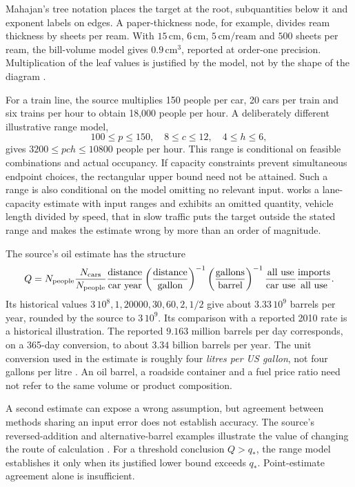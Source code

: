 Mahajan's tree notation places the target at the root, subquantities below
it and exponent labels on edges. A paper-thickness node, for example, divides
ream thickness by sheets per ream. With \(15\,\mathrm{cm}\),
\(6\,\mathrm{cm}\), \(5\,\mathrm{cm/ream}\) and \(500\) sheets per ream,
the bill-volume model gives \(0.9\,\mathrm{cm^3}\), reported at order-one
precision. Multiplication of the leaf values is justified by the model,
not by the shape of the diagram \cite[1.3]{Mahajan2014Insight}.

For a train line, the source multiplies 150 people per car, 20 cars per train
and six trains per hour to obtain 18,000 people per hour.
A deliberately different illustrative range model,
\[
 100\leq p\leq150,\quad 8\leq c\leq12,\quad4\leq h\leq6,
\]
gives \(3200\leq pch\leq10800\) people per hour.
This range is conditional on feasible combinations and actual occupancy.
If capacity constraints prevent simultaneous endpoint choices, the
rectangular upper bound need not be attained.
Such a range is also conditional on the model omitting no relevant input.
 works a lane-capacity estimate with input
ranges and exhibits an omitted quantity, vehicle length divided by speed,
that in slow traffic puts the target outside the stated range and makes the
estimate wrong by more than an order of magnitude.

The source's oil estimate has the structure
\[
 Q=N_{\rm people}\frac{N_{\rm cars}}{N_{\rm people}}
 \frac{\text{distance}}{\text{car year}}
 \left(\frac{\text{distance}}{\text{gallon}}\right)^{-1}
 \left(\frac{\text{gallons}}{\text{barrel}}\right)^{-1}
 \frac{\text{all use}}{\text{car use}}
 \frac{\text{imports}}{\text{all use}}.
\]
Its historical values \(3\,10^8,1,20000,30,60,2,1/2\) give about
\(3.33\,10^9\) barrels per year, rounded by the source to \(3\,10^9\).
Its comparison with a reported 2010 rate is a historical illustration.
The reported \(9.163\) million barrels per day corresponds, on a
365-day conversion, to about \(3.34\) billion barrels per year.
The unit conversion used in the estimate is roughly four \emph{litres per
US gallon}, not four gallons per litre \cite[1.4]{Mahajan2014Insight}.
An oil barrel, a roadside container and a fuel price ratio need not refer
to the same volume or product composition.

A second estimate can expose a wrong assumption, but agreement between
methods sharing an input error does not establish accuracy.
The source's reversed-addition and alternative-barrel examples illustrate
the value of changing the route of calculation \cite[1.5]{Mahajan2014Insight}.
For a threshold conclusion \(Q>q_*\), the range model establishes it only
when its justified lower bound exceeds \(q_*\). Point-estimate agreement
alone is insufficient.

